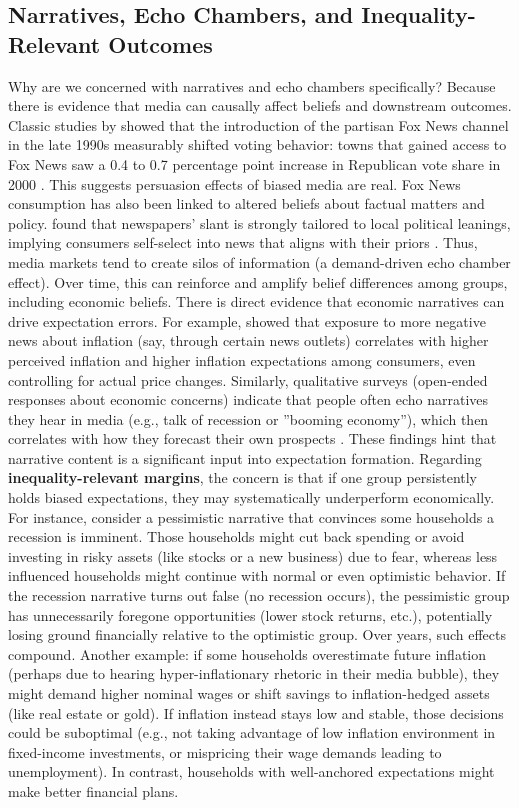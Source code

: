 \documentclass[12pt]{article}
\begin{document}
\subsection*{Narratives, Echo Chambers, and Inequality-Relevant Outcomes}
Why are we concerned with narratives and echo chambers specifically? Because there is evidence that media can causally affect beliefs and downstream outcomes. Classic studies by \citet{DellaVigna2007} showed that the introduction of the partisan Fox News channel in the late 1990s measurably shifted voting behavior: towns that gained access to Fox News saw a 0.4 to 0.7 percentage point increase in Republican vote share in 2000 \citep{DellaVigna2007}. This suggests persuasion effects of biased media are real. Fox News consumption has also been linked to altered beliefs about factual matters and policy. \citet{GentzkowShapiro2010} found that newspapers' slant is strongly tailored to local political leanings, implying consumers self-select into news that aligns with their priors \citep{DellaVigna2007}. Thus, media markets tend to create silos of information (a demand-driven echo chamber effect). Over time, this can reinforce and amplify belief differences among groups, including economic beliefs.
There is direct evidence that economic narratives can drive expectation errors. For example, \citet{ArmantierEtAl2016PriceIsRight} showed that exposure to more negative news about inflation (say, through certain news outlets) correlates with higher perceived inflation and higher inflation expectations among consumers, even controlling for actual price changes. Similarly, qualitative surveys (open-ended responses about economic concerns) indicate that people often echo narratives they hear in media (e.g., talk of recession or ''booming economy''), which then correlates with how they forecast their own prospects \citep{Shiller2017}. These findings hint that narrative content is a significant input into expectation formation.
Regarding \textbf{inequality-relevant margins}, the concern is that if one group persistently holds biased expectations, they may systematically underperform economically. For instance, consider a pessimistic narrative that convinces some households a recession is imminent. Those households might cut back spending or avoid investing in risky assets (like stocks or a new business) due to fear, whereas less influenced households might continue with normal or even optimistic behavior. If the recession narrative turns out false (no recession occurs), the pessimistic group has unnecessarily foregone opportunities (lower stock returns, etc.), potentially losing ground financially relative to the optimistic group. Over years, such effects compound. Another example: if some households overestimate future inflation (perhaps due to hearing hyper-inflationary rhetoric in their media bubble), they might demand higher nominal wages or shift savings to inflation-hedged assets (like real estate or gold). If inflation instead stays low and stable, those decisions could be suboptimal (e.g., not taking advantage of low inflation environment in fixed-income investments, or mispricing their wage demands leading to unemployment). In contrast, households with well-anchored expectations might make better financial plans.
\end{document}
